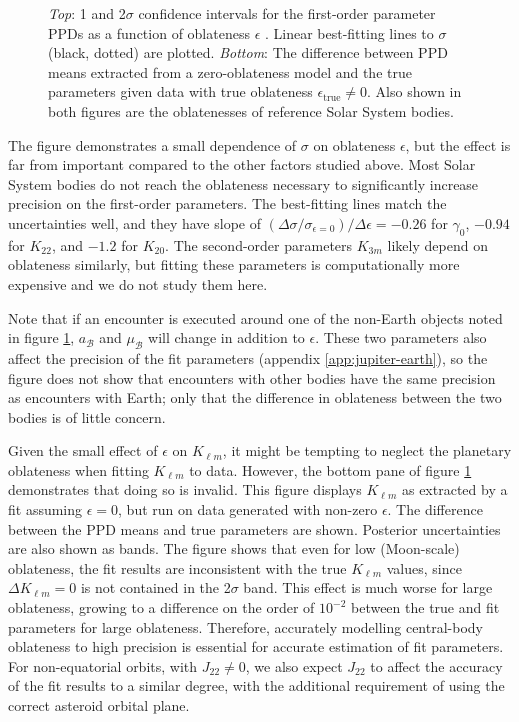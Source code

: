 \documentclass[fleqn,usenatbib]{mnras}
\begin{document}
\begin{figure}
  \caption{\textit{Top}: 1 and 2$\sigma$ confidence intervals for the first-order parameter PPDs as a function of oblateness $\epsilon$ . Linear best-fitting lines to $\sigma$ (black, dotted) are plotted. \textit{Bottom}: The difference between PPD means extracted from a zero-oblateness model and the true parameters given data with true oblateness $\epsilon_\text{true} \neq 0$. Also shown in both figures are the oblatenesses of reference Solar System bodies.}
  \label{fig:scan-oblateness}
\end{figure}

The figure demonstrates a small dependence of $\sigma$ on oblateness $\epsilon$, but the effect is far from important compared to the other factors studied above. Most Solar System bodies do not reach the oblateness necessary to significantly increase precision on the first-order parameters. The best-fitting lines match the uncertainties well, and they have slope of $(\Delta \sigma / \sigma_{\epsilon=0}) / \Delta \epsilon = -0.26$ for $\gamma_0$, $-0.94$ for $K_{22}$, and $-1.2$ for $K_{20}$. The second-order parameters $K_{3m}$ likely depend on oblateness similarly, but fitting these parameters is computationally more expensive and we do not study them here.

Note that if an encounter is executed around one of the non-Earth objects noted in figure \ref{fig:scan-oblateness}, $a_\mathcal{B}$ and $\mu_\mathcal{B}$ will change in addition to $\epsilon$. These two parameters also affect the precision of the fit parameters (appendix \ref{app:jupiter-earth}), so the figure does not show that encounters with other bodies have the same precision as encounters with Earth; only that the difference in oblateness between the two bodies is of little concern.

Given the small effect of $\epsilon$ on $K_{\ell m}$, it might be tempting to neglect the planetary oblateness when fitting $K_{\ell m}$ to data. However, the bottom pane of figure \ref{fig:scan-oblateness} demonstrates that doing so is invalid. This figure displays $K_{\ell m}$ as extracted by a fit assuming $\epsilon = 0$, but run on data generated with non-zero $\epsilon$. The difference between the PPD means and true parameters are shown. Posterior uncertainties are also shown as bands. The figure shows that even for low (Moon-scale) oblateness, the fit results are inconsistent with the true $K_{\ell m}$ values, since $\Delta K_{\ell m} = 0$ is not contained in the 2$\sigma$ band. This effect is much worse for large oblateness, growing to a difference on the order of $10^{-2}$ between the true and fit parameters for large oblateness. Therefore, accurately modelling central-body oblateness to high precision is essential for accurate estimation of fit parameters. For non-equatorial orbits, with $J_{22} \neq 0$, we also expect $J_{22}$ to affect the accuracy of the fit results to a similar degree, with the additional requirement of using the correct asteroid orbital plane.
\end{document}
